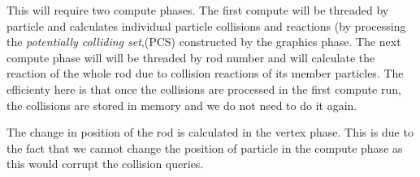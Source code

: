 This will require two compute phases. The first compute will be threaded by particle and calculates individual particle collisions and reactions (by processing the \textit{potentially colliding set},(PCS) constructed by the graphics phase. The next compute phase will will be threaded by rod number and will calculate the reaction of the whole rod due to collision reactions of its member particles. The efficienty here is that once the collisions are processed in the first compute run, the collisions are stored in memory and we do not need to do it again. 

The change in position of the rod is calculated in the vertex phase. This is due to the fact that we cannot change the position of particle in the compute phase as this would corrupt the collision queries.



